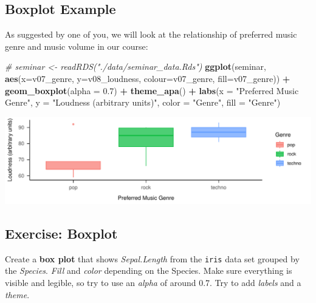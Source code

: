 \documentclass[
]{book}
\newenvironment{Shaded}{\begin{snugshade}}{\end{snugshade}}
\newcommand{\AttributeTok}[1]{\textcolor[rgb]{0.13,0.29,0.53}{#1}}
\newcommand{\CommentTok}[1]{\textcolor[rgb]{0.56,0.35,0.01}{\textit{#1}}}
\newcommand{\FloatTok}[1]{\textcolor[rgb]{0.00,0.00,0.81}{#1}}
\newcommand{\FunctionTok}[1]{\textcolor[rgb]{0.13,0.29,0.53}{\textbf{#1}}}
\newcommand{\NormalTok}[1]{#1}
\newcommand{\SpecialCharTok}[1]{\textcolor[rgb]{0.81,0.36,0.00}{\textbf{#1}}}
\newcommand{\StringTok}[1]{\textcolor[rgb]{0.31,0.60,0.02}{#1}}
\begin{document}
\subsection{Boxplot Example}\label{boxplot-example}

As suggested by one of you, we will look at the relationship of preferred music genre and music volume in our course:

\begin{Shaded}
\begin{Highlighting}[]
\CommentTok{\# seminar \textless{}{-} readRDS("./data/seminar\_data.Rds")}
\FunctionTok{ggplot}\NormalTok{(seminar, }\FunctionTok{aes}\NormalTok{(}\AttributeTok{x=}\NormalTok{v07\_genre, }\AttributeTok{y=}\NormalTok{v08\_loudness, }\AttributeTok{colour=}\NormalTok{v07\_genre, }\AttributeTok{fill=}\NormalTok{v07\_genre)) }\SpecialCharTok{+}
  \FunctionTok{geom\_boxplot}\NormalTok{(}\AttributeTok{alpha =} \FloatTok{0.7}\NormalTok{) }\SpecialCharTok{+} \FunctionTok{theme\_apa}\NormalTok{() }\SpecialCharTok{+}
  \FunctionTok{labs}\NormalTok{(}\AttributeTok{x =} \StringTok{"Preferred Music Genre"}\NormalTok{, }\AttributeTok{y =} \StringTok{"Loudness (arbitrary units)"}\NormalTok{, }
       \AttributeTok{color =} \StringTok{"Genre"}\NormalTok{, }\AttributeTok{fill =} \StringTok{"Genre"}\NormalTok{)}
\end{Highlighting}
\end{Shaded}

\includegraphics{_main_files/figure-latex/unnamed-chunk-51-1.pdf}

\subsection{Exercise: Boxplot}\label{exercise-boxplot}

Create a \textbf{box plot} that shows \emph{Sepal.Length} from the \texttt{iris} data set grouped by the \emph{Species}.
\emph{Fill} and \emph{color} depending on the Species.
Make sure everything is visible and legible, so try to use an \emph{alpha} of around 0.7.
Try to add \emph{labels} and a \emph{theme}.
\end{document}
